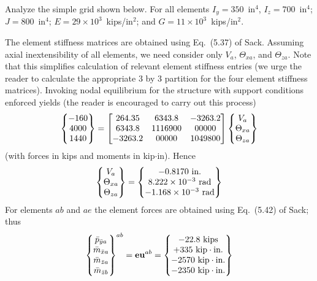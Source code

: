 \begin{enumerate}[leftmargin=*]
    \begin{example}
    Analyze the simple grid shown below. For all elements $I_y = 350$~in$^4$, $I_z = 700$~in$^4$; $J = 800$~in$^4$; $E = 29\times10^3$~kips/in$^2$; and $G = 11\times10^3$~kips/in$^2$.
    \begin{fig}
      
    \end{fig}
    \begin{solution}
    The element stiffness matrices are obtained using Eq.~(5.37) of Sack. Assuming axial inextensibility of all elements, we need consider only $V_a$, $\Theta_{xa}$, and $\Theta_{za}$. Note that this simplifies calculation of relevant element stiffness entries (we urge the reader to calculate the appropriate 3 by 3 partition for the four element stiffness matrices). Invoking nodal equilibrium for the structure with support conditions enforced yields (the reader is encouraged to carry out this process)
    \begin{equation*}
      \begin{Bmatrix}-160\\ 4000\\ 1440\end{Bmatrix} = \begin{bmatrix}264.35 & 6343.8 & -3263.2\\ 6343.8 & 1116900 & 00000\\ -3263.2 & 00000 & 1049800\end{bmatrix}\begin{Bmatrix}V_a\\ \Theta_{xa}\\ \Theta_{za}\end{Bmatrix}
    \end{equation*}
    (with forces in kips and moments in kip$\cdot$in). Hence
    \begin{equation*}
      \begin{Bmatrix}V_a\\ \Theta_{xa}\\ \Theta_{za}\end{Bmatrix} = \begin{Bmatrix}-0.8170\text{ in.}\\ 8.222\times10^{-3}\text{ rad}\\ -1.168\times10^{-3}\text{ rad}\end{Bmatrix}
    \end{equation*}
    For elements $ab$ and $ae$ the element forces are obtained using Eq.~(5.42) of Sack; thus
    \begin{equation*}
      \Bmat{\bar p_{\bar ya}\\ \bar m_{\bar xa}\\ \bar m_{\bar za}\\ \bar m_{\bar zb}}^{ab} = \mat{e}\mat{u}^{ab} = \Bmat{-22.8\text{ kips}\\ +335\text{ kip}\cdot\text{in.}\\ -2570\text{ kip}\cdot\text{in.}\\ -2350\text{ kip}\cdot\text{in.}}

\end{equation*}
\end{solution}
\end{example}
\end{enumerate}
